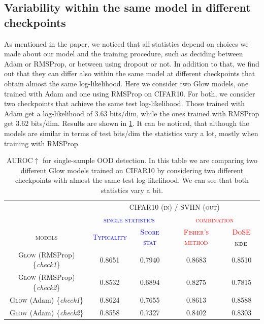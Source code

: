{\subsection{Variability within the same model in different checkpoints}
\label{appendix_modelagnostic:checkpoints}
As mentioned in the paper, we noticed that all statistics depend on choices we made about our model and the training procedure, such as deciding between Adam or RMSProp, or between using dropout or not. In addition to that, we find out that they can differ also within the same model at different checkpoints that obtain almost the same log-likelihood. Here we consider two Glow models, one trained with Adam and one using RMSProp on CIFAR10. For both, we consider two checkpoints that achieve the same test log-likelihood. Those trained with Adam get a log-likelihood of $3.63$ bits/dim, while the ones trained with RMSProp get $3.62$ bits/dim. Results are shown in \cref{tab_modelagnostic:variability}. It can be noticed, that although the models are similar in terms of test bits/dim the statistics vary a lot, mostly when training with RMSProp.

\begin{table}[tb]
    \centering
    \caption[AUROC$\uparrow$ for single-sample OOD detection comparing two different Glow models on single and combined statistics.]{AUROC$\uparrow$ for single-sample OOD detection. In this table we are comparing two different Glow models trained on CIFAR10 by considering two different checkpoints with almost the same test log-likelihood. We can see that both statistics vary a bit.}
        \scriptsize
        \begin{tabular}{ccccc}
            \toprule
            &\multicolumn{4}{c}{\textsc{CIFAR10 (in) / SVHN (out)}}\\
            \cmidrule{2-5}
            & \multicolumn{2}{c}{\textcolor{blue}{\textsc{single statistics}}} & \multicolumn{2}{c}{\textcolor{red}{\textsc{combination}}}\\
            \cmidrule(r){2-3}\cmidrule(l){4-5}
            \textsc{models}  &  \textcolor{blue}{\textsc{Typicality}} & \textcolor{blue}{\textsc{Score stat}} & \textcolor{red}{\textsc{Fisher's method}} & \textcolor{red}{\textsc{DoSE$_{\textup{KDE}}$}} \\
            \midrule
            \textsc{Glow} (RMSProp) \{\emph{check1}\} & 0.8651 &  0.7940  &  0.8683 &  0.8510\\
            \textsc{Glow} (RMSProp) \{\emph{check2}\} & 0.8532 &  0.6894  & 0.8275 & 0.7815\\
            \midrule
            \textsc{Glow} (Adam)  \{\emph{check1}\} & 0.8624 &  0.7655 & 0.8613 & 0.8588\\
            \textsc{Glow} (Adam) \{\emph{check2}\} & 0.8558 & 0.7327 & 0.8402 & 0.8303\\
            \bottomrule
        \end{tabular}
        \label{tab_modelagnostic:variability}
    \vspace*{-\baselineskip}
\end{table}



}
